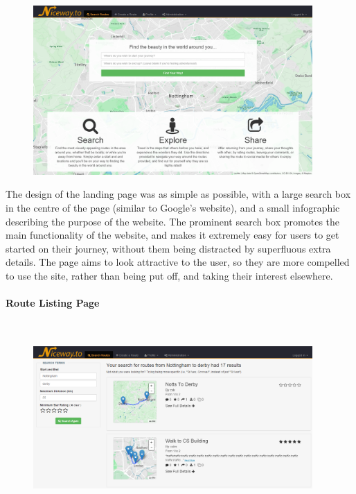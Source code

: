 \begin{figure}[!ht]
	\vspace{-6mm}
	\begin{center}
		\includegraphics[width=0.95\textwidth]{images/design/landing.png}
	\end{center}
	\vspace{-7mm}
\end{figure}
\noindent 
The design of the landing page was as simple as possible, with a large search box in the centre of the page (similar to Google's website), and a small infographic describing the purpose of the website. The prominent search box promotes the main functionality of the website, and makes it extremely easy for users to get started on their journey, without them being distracted by superfluous extra details. The page aims to look attractive to the user, so they are more compelled to use the site, rather than being put off, and taking their interest elsewhere.

\paragraph{Route Listing Page}\ \\

\begin{figure}[!ht]
	\vspace{-5mm}
	\begin{center}
		\includegraphics[width=0.95\textwidth]{images/design/listing.png}
	\end{center}
	\vspace{-10mm}
\end{figure}
\newpage 


